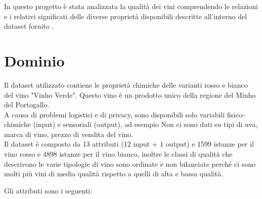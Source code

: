 In questo progetto è stata analizzata la qualità dei vini comprendendo le relazioni e i relativi significati delle diverse proprietà disponibili descritte all'interno del dataset fornito \cite{cortez2009modeling}.

\section{Dominio}
\label{ch:dominio}

Il dataset utilizzato contiene le proprietà chimiche delle varianti rosso e bianco del vino "Vinho Verde". Questo vino è un prodotto unico della regione del Minho del Portogallo.\\
A causa di problemi logistici e di privacy, sono disponibili solo variabili fisico-chimiche (input) e sensoriali (output), ad esempio Non ci sono dati su tipi di uva, marca di vino, prezzo di vendita del vino.\\
Il dataset è composto da 13 attributi (12 input + 1 output) e 1599 istanze per il vino rosso e 4898 istanze per il vino bianco, inoltre le classi di qualità che descrivono le varie tipologie di vino sono ordinate e non bilanciate perché ci sono molti più vini di media qualità rispetto a quelli di alta e bassa qualità.

\vspace{4mm}

\noindent
Gli attributi sono i seguenti:

